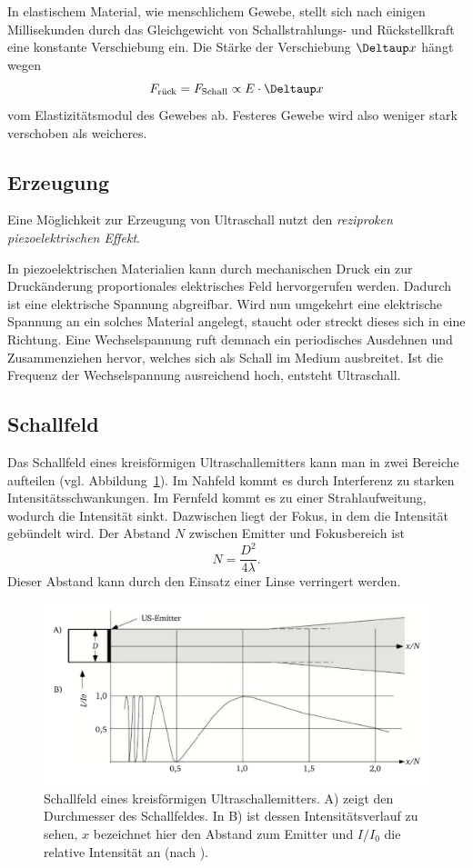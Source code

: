 \documentclass[
    11pt,
    ngerman
]{scrbook}
\begin{document}
In elastischem Material, wie menschlichem Gewebe, stellt sich nach einigen
Millisekunden durch das Gleichgewicht von Schallstrahlungs- und
Rückstellkraft  eine konstante Verschiebung ein. Die Stärke der Verschiebung
$\Deltaup x$ hängt wegen 
\[
    F_\text{rück} = F_\text{Schall} \propto E\cdot\Deltaup x
\]
vom Elastizitätsmodul des Gewebes ab. Festeres Gewebe wird also weniger stark
verschoben als weicheres.


\subsection{Erzeugung}

Eine Möglichkeit zur Erzeugung von Ultraschall nutzt den
\emph{reziproken piezoelektrischen Effekt}.

In piezoelektrischen Materialien kann durch mechanischen Druck ein zur
Druckänderung proportionales elektrisches Feld hervorgerufen werden. Dadurch
ist eine elektrische Spannung abgreifbar. Wird nun umgekehrt eine elektrische
Spannung an ein solches Material angelegt, staucht oder streckt dieses sich in
eine Richtung. Eine Wechselspannung ruft demnach ein periodisches Ausdehnen
und Zusammenziehen hervor, welches sich als Schall im Medium ausbreitet. Ist
die Frequenz der Wechselspannung ausreichend hoch, entsteht Ultraschall.

\subsection{Schallfeld}

Das Schallfeld eines kreisförmigen Ultraschallemitters kann man in zwei Bereiche aufteilen (vgl. Abbildung~\ref{fig:us-feld}). Im Nahfeld kommt es durch Interferenz zu starken Intensitätsschwankungen. Im Fernfeld kommt es zu einer Strahlaufweitung, wodurch die Intensität sinkt. Dazwischen liegt der Fokus, in dem die Intensität gebündelt wird. Der Abstand $N$ zwischen Emitter und Fokusbereich ist
\[
    N = \frac{D^2}{4\lambda}.
\]
Dieser Abstand kann durch den Einsatz einer Linse verringert werden.

\begin{figure}[htbp]
    \centering
    \includegraphics[width=.8\textwidth]{Abbildungen/US_Feld.pdf}
    \caption{%
        Schallfeld eines kreisförmigen Ultraschallemitters. A) zeigt den Durchmesser des Schallfeldes. In B) ist dessen Intensitätsverlauf zu sehen, $x$ bezeichnet hier den Abstand zum Emitter und $I/I_0$ die relative Intensität an (nach \parencite{bildgebende_verfahren}).
    }
    \label{fig:us-feld}
\end{figure}
\end{document}
